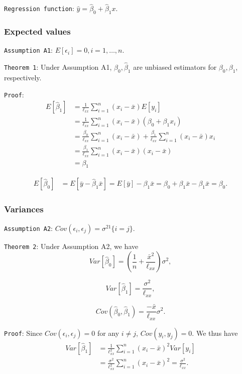 \documentclass[]{article}
\begin{document}
\texttt{Regression\ function}: \(\hat y=\hat\beta_0+\hat\beta_1x\).

\hypertarget{expected-values}{%
\subsubsection{Expected values}\label{expected-values}}

\texttt{Assumption\ A1}: \(E[\epsilon_i]=0,i=1,\dots,n\).

\texttt{Theorem\ 1}: Under Assumption A1, \(\hat\beta_0,\hat\beta_1\)
are unbiased estimators for \(\beta_0,\beta_1\), respectively.

\texttt{Proof}: \[
\begin{align}
E[\hat \beta_1] &= \frac{1}{\ell_{xx}}\sum_{i=1}^n(x_i-\bar x)E[y_i]\\
&=\frac{1}{\ell_{xx}}\sum_{i=1}^n(x_i-\bar x)(\beta_0+\beta_1x_i)\\
&=\frac{\beta_0}{\ell_{xx}}\sum_{i=1}^n(x_i-\bar x)+\frac{\beta_1}{\ell_{xx}}\sum_{i=1}^n(x_i-\bar x)x_i\\
&=\frac{\beta_1}{\ell_{xx}}\sum_{i=1}^n(x_i-\bar x)(x_i-\bar x)\\
&=\beta_1
\end{align}
\]

\[
\begin{align}
E[\hat \beta_0] &= E[\bar y-\hat\beta_1\bar x]=E[\bar y]-\beta_1\bar x=\beta_0+\beta_1\bar x-\beta_1\bar x=\beta_0.
\end{align}
\]

\hypertarget{variances}{%
\subsubsection{Variances}\label{variances}}

\texttt{Assumption\ A2}:
\(Cov(\epsilon_i,\epsilon_j)=\sigma^21\{i=j\}\).

\texttt{Theorem\ 2}: Under Assumption A2, we have
\[Var[\hat\beta_0] = \left(\frac 1n+\frac{\bar x^2}{\ell_{xx}}\right)\sigma^2,\]

\[Var[\hat\beta_1] =\frac{\sigma^2}{\ell_{xx}},\]

\[Cov(\hat\beta_0,\hat\beta_1) = \frac{-\bar x}{\ell_{xx}}\sigma^2.\]

\texttt{Proof}: Since \(Cov(\epsilon_i,\epsilon_j)=0\) for any
\(i\neq j\), \(Cov(y_i,y_j)=0\). We thus have \[
\begin{align}
Var[\hat\beta_1] &= \frac{1}{\ell_{xx}^2}\sum_{i=1}^n(x_i-\bar x)^2Var[y_i]\\
&= \frac{\sigma^2}{\ell_{xx}^2}\sum_{i=1}^n(x_i-\bar x)^2=\frac{\sigma^2}{\ell_{xx}}.
\end{align}
\]
\end{document}

